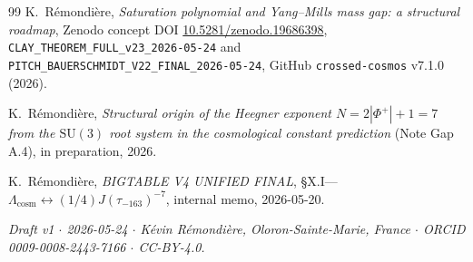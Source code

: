 \documentclass[11pt,letterpaper,twoside]{article}
\newcommand{\SUthree}{\mathrm{SU}(3)}
\newcommand{\Heegner}{\tau_{-163}}
\begin{document}
\begin{thebibliography}{99}
K.~R\'emondi\`ere, \emph{Saturation polynomial and Yang--Mills mass gap: a
structural roadmap}, Zenodo concept DOI
\href{https://doi.org/10.5281/zenodo.19686398}{10.5281/zenodo.19686398},
\texttt{CLAY\_THEOREM\_FULL\_v23\_2026-05-24} and
\texttt{PITCH\_BAUERSCHMIDT\_V22\_FINAL\_2026-05-24}, GitHub
\texttt{crossed-cosmos} v7.1.0 (2026).

K.~R\'emondi\`ere, \emph{Structural origin of the Heegner exponent
$N=2|\Phi^{+}|+1=7$ from the $\SUthree$ root system in the cosmological
constant prediction} (Note Gap A.4), in preparation, 2026.

K.~R\'emondi\`ere, \emph{BIGTABLE V4 UNIFIED FINAL}, \S X.I---%
$\Lambda_{\mathrm{cosm}}\leftrightarrow(1/4)J(\Heegner)^{-7}$,
internal memo, 2026-05-20.

\end{thebibliography}

\bigskip

\noindent\small\emph{Draft v1 $\cdot$ 2026-05-24 $\cdot$ K\'evin R\'emondi\`ere,
Oloron-Sainte-Marie, France $\cdot$ ORCID 0009-0008-2443-7166 $\cdot$
CC-BY-4.0.}
\end{document}
